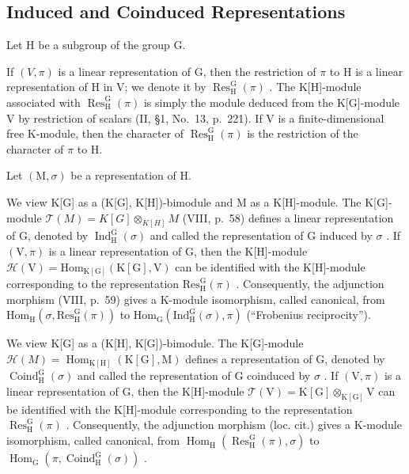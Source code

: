 \subsection{Induced and Coinduced Representations}

Let H be a subgroup of the group G.

If \((V,\pi)\) is a linear representation of G, then the restriction of \(\pi\) to H is a linear representation of H in V; we denote it by \(\operatorname{Res}_{\mathrm{H}}^{\mathrm{G}}(\pi)\) . The K{[}H{]}-module associated with \(\operatorname{Res}_{\mathrm{H}}^{\mathrm{G}}(\pi)\) is simply the module deduced from the K{[}G{]}-module V by restriction of scalars (II, §1, No.~13, p.~221). If V is a finite-dimensional free K-module, then the character of \(\operatorname{Res}_{\mathrm{H}}^{\mathrm{G}}(\pi)\) is the restriction of the character of \(\pi\) to H.

Let \((\mathrm{M},\sigma)\) be a representation of H.

We view K{[}G{]} as a (K{[}G{]}, K{[}H{]})-bimodule and M as a K{[}H{]}-module. The K{[}G{]}-module \(\mathcal{T}(M) = K[G] \otimes_{K[H]} M\) (VIII, p.~58) defines a linear representation of G, denoted by \(\operatorname{Ind}_{\mathrm{H}}^{\mathrm{G}}(\sigma)\) and called the representation of G induced by \(\sigma\) . If \((\mathrm{V}, \pi)\) is a linear representation of G, then the K{[}H{]}-module \(\mathcal{H}(\mathrm{V}) = \mathrm{Hom}_{\mathrm{K[G]}}(\mathrm{K[G]},\mathrm{V})\) can be identified with the K{[}H{]}-module corresponding to the representation \(\mathrm{Res}_{\mathrm{H}}^{\mathrm{G}}(\pi)\) . Consequently, the adjunction morphism (VIII, p.~59) gives a K-module isomorphism, called canonical, from \(\mathrm{Hom}_{\mathrm{H}}(\sigma ,\mathrm{Res}_{\mathrm{H}}^{\mathrm{G}}(\pi))\) to \(\mathrm{Hom}_{\mathrm{G}}(\mathrm{Ind}_{\mathrm{H}}^{\mathrm{G}}(\sigma),\pi)\) (``Frobenius reciprocity'').

We view K{[}G{]} as a (K{[}H{]}, K{[}G{]})-bimodule. The K{[}G{]}-module \(\mathcal{H}(M) = \operatorname{Hom}_{\mathrm{K}[\mathrm{H}]}(\mathrm{K}[\mathrm{G}], \mathrm{M})\) defines a representation of G, denoted by \(\operatorname{Coind}_{\mathrm{H}}^{\mathrm{G}}(\sigma)\) and called the representation of G coinduced by \(\sigma\) . If \((\mathrm{V}, \pi)\) is a linear representation of G, then the K{[}H{]}-module \(\mathcal{T}(\mathrm{V}) = \mathrm{K}[\mathrm{G}] \otimes_{\mathrm{K}[\mathrm{G}]} \mathrm{V}\) can be identified with the K{[}H{]}-module corresponding to the representation \(\operatorname{Res}_{\mathrm{H}}^{\mathrm{G}}(\pi)\) . Consequently, the adjunction morphism (loc. cit.) gives a K-module isomorphism, called canonical, from \(\operatorname{Hom}_{\mathrm{H}}(\operatorname{Res}_{\mathrm{H}}^{\mathrm{G}}(\pi), \sigma)\) to \(\operatorname{Hom}_{\mathrm{G}}(\pi, \operatorname{Coind}_{\mathrm{H}}^{\mathrm{G}}(\sigma))\) .

